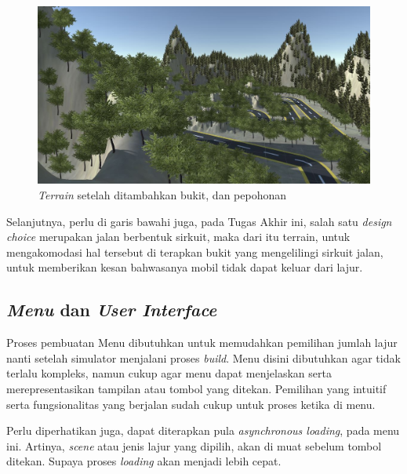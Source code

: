     \begin{figure} [!htb]
	    \captionsetup{justification=centering}
	    \includegraphics[scale=0.35]{img/terrain.JPG}
	    \caption{\textit{Terrain} setelah ditambahkan bukit, dan pepohonan}
	    \label{fig: 3_17}
    \end{figure}
    
    Selanjutnya, perlu di garis bawahi juga, pada Tugas Akhir ini, salah satu \textit{design choice} merupakan jalan berbentuk sirkuit, maka dari itu terrain, untuk mengakomodasi hal tersebut di terapkan bukit yang mengelilingi sirkuit jalan, untuk memberikan kesan bahwasanya mobil tidak dapat keluar dari lajur.
    
    \subsection{\textit{Menu} dan \textit{User Interface}}
    
    Proses pembuatan Menu dibutuhkan untuk memudahkan pemilihan jumlah lajur nanti setelah simulator menjalani proses \textit{build}. Menu disini dibutuhkan agar tidak terlalu kompleks, namun cukup agar menu dapat menjelaskan serta merepresentasikan tampilan atau tombol yang ditekan. Pemilihan yang intuitif serta fungsionalitas yang berjalan sudah cukup untuk proses ketika di menu.
    \par Perlu diperhatikan juga, dapat diterapkan pula \textit{asynchronous loading}, pada menu ini. Artinya, \textit{scene} atau jenis lajur yang dipilih, akan di muat sebelum tombol ditekan. Supaya proses \textit{loading} akan menjadi lebih cepat.
    
